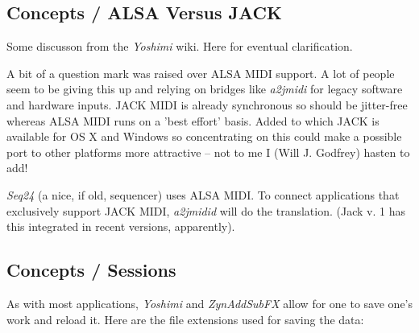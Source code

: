 \subsection{Concepts / ALSA Versus JACK}
\label{subsec:concepts_alsa_versus_jack}

   Some discusson from the \textsl{Yoshimi} wiki.  Here for eventual
   clarification.

   A bit of a question mark was raised over ALSA MIDI support. A lot of
   people seem to be giving this up and relying on bridges like
   \textsl{a2jmidi} for legacy software and hardware inputs. JACK MIDI is
   already synchronous so should be jitter-free whereas ALSA MIDI runs on a
   'best effort' basis. Added to which JACK is available for OS X and
   Windows so concentrating on this could make a possible port to other
   platforms more attractive -- not to me I (Will J. Godfrey) hasten to add!

   \textsl{Seq24} (a nice, if old, sequencer) uses ALSA MIDI. To connect
   applications that exclusively support JACK MIDI, \textsl{a2jmidid} will
   do the translation.  (Jack v. 1 has this integrated in recent versions,
   apparently).

\subsection{Concepts / Sessions}
\label{subsec:concepts_sessions}

   As with most applications, \textsl{Yoshimi} and \textsl{ZynAddSubFX}
   allow for one to save one's work and reload it.
   Here are the file extensions used for saving the data:

